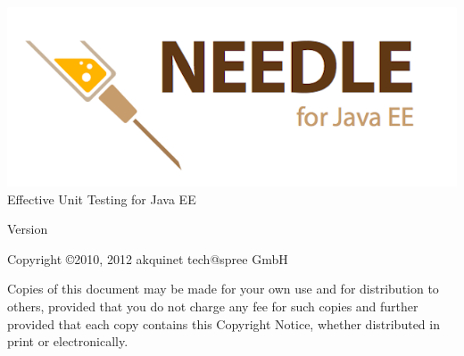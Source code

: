 \begin{titlepage}
	 \HRule 
	\begin{flushleft} 
	    \includegraphics[width=180mm]{NeedleLogo.png} \\
		\LARGE Effective Unit Testing for Java EE \\
	\end{flushleft}
	\HRule {} 
	\begin{center} 
		\large Version \NeedleVersion 
	\end{center}
	\begin{center}
		\large Copyright \copyright 2010, 2012 akquinet tech@spree GmbH 
	\end{center}
	\begin{center} 
		Copies of this document may be made for your own use and for distribution to others, 
		provided that you do not charge any fee for such copies and further provided that each 
		copy contains this Copyright Notice, whether distributed in print or
		electronically.
	\end{center}
\end{titlepage}